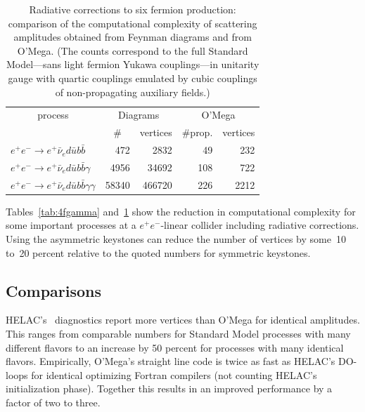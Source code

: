 \documentclass[12pt,a4paper]{article}
\begin{document}
\begin{table}
  \begin{center}
    \begin{tabular}{l|rr|rr}
                    \multicolumn{1}{c|}{process}
                  & \multicolumn{2}{c|}{Diagrams}
                  & \multicolumn{2}{c}{O'Mega} \\
                  & \multicolumn{1}{c}{\#} & vertices
                  & \#prop. & vertices \\%
      $e^+e^-\to e^+\bar\nu_e d\bar u b\bar b$
        &    472 &   2832 &  49 &   232 \\
      $e^+e^-\to e^+\bar\nu_e d\bar u b\bar b \gamma$
        &   4956 &  34692 & 108 &   722 \\
      $e^+e^-\to e^+\bar\nu_e d\bar u b\bar b \gamma\gamma$
        &  58340 & 466720 & 226 &  2212
    \end{tabular}
  \end{center}
  \caption{\label{tab:6fgamma}%
    Radiative corrections to six fermion production: comparison of
    the computational complexity of scattering amplitudes obtained
    from Feynman diagrams and from O'Mega. (The counts correspond to
    the full Standard Model---sans light fermion Yukawa couplings---in
    unitarity gauge with quartic couplings emulated by cubic 
    couplings of non-propagating auxiliary fields.)}
\end{table}

Tables~\ref{tab:4fgamma} and~\ref{tab:6fgamma} show the reduction in
computational complexity for some important processes at a
$e^+e^-$-linear collider including radiative corrections.  Using the
asymmetric keystones can reduce the number of vertices by some~10
to~20 percent relative to the quoted numbers for symmetric keystones.

\subsection{Comparisons}
\label{sec:comparisons}

HELAC's~\cite{HELAC:2000} diagnostics report more vertices than O'Mega
for identical amplitudes.  This ranges from comparable numbers for
Standard Model processes with many different flavors to an increase by
50 percent for processes with many identical flavors.  Empirically,
O'Mega's straight line code is twice as fast as HELAC's DO-loops for
identical optimizing Fortran compilers (not counting HELAC's
initialization phase).  Together this results in an improved
performance by a factor of two to three.
\end{document}
